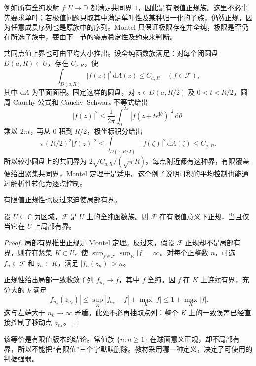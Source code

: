 \ProseParagraphBreak

例如所有全纯映射 \(f:U\to\mathbb D\) 都满足共同界 \(1\)，因此是有限值正规族。这里不必事先要求单叶；若极值问题只取其中满足单叶性及某种归一化的子族，仍然正规，因为任意成员序列也是原族中的序列。Montel 只保证极限存在并全纯，极限是否仍在所选子族中，要由下一节的零点稳定性及约束来判断。

\ProseParagraphBreak

共同点值上界也可由平均大小推出。设全纯函数族满足：对每个闭圆盘 \(\overline{D(a,R)}\subset U\)，存在 \(C_{a,R}\)，使
\[
 \int_{D(a,R)}|f(z)|^2\,\mathrm{d}A(z)\le C_{a,R}
 \quad(f\in\mathcal F),
\]
其中 \(\mathrm dA\) 为平面面积。固定这样的圆盘，对 \(z\in D(a,R/2)\) 及 \(0<t<R/2\)，圆周 Cauchy 公式和 Cauchy--Schwarz 不等式给出
\[
 |f(z)|^2
 \le\frac1{2\pi}\int_0^{2\pi}|f(z+te^{\mathrm{i}\theta})|^2\,\mathrm d\theta.
\]
乘以 \(2\pi t\)，再从 \(0\) 积到 \(R/2\)，极坐标积分给出
\[
 \pi(R/2)^2|f(z)|^2
 \le\int_{D(z,R/2)}|f(\zeta)|^2\,\mathrm dA(\zeta)
 \le C_{a,R}.
\]
所以较小圆盘上的共同界为 \(2\sqrt{C_{a,R}}/(\sqrt\pi R)\)。每点附近都有这种界，有限覆盖便给出紧集共同界，Montel 定理于是适用。这个例子说明可积的平均控制也能通过解析性转化为逐点控制。

\ProseParagraphBreak

有限值正规性也反过来迫使局部有界。
\begin{proposition}\label{b3:prop:04-normal-bounded-equivalence}
设 \(U\subseteq\mathbb C\) 为区域，\(\mathcal F\) 是 \(U\) 上的全纯函数族。则 \(\mathcal F\) 在有限值意义下正规，当且仅当它在 \(U\) 上局部有界。
\end{proposition}
\begin{proof}
局部有界推出正规是 Montel 定理。反过来，假设 \(\mathcal F\) 正规却不是局部有界，则存在紧集 \(K\subset U\)，使 \(\sup_{f\in\mathcal F}\sup_K|f|=\infty\)。对每个正整数 \(n\)，可选 \(f_n\in\mathcal F\) 和 \(z_n\in K\)，满足 \(|f_n(z_n)|>n\)。

正规性给出局部一致收敛子列 \(f_{n_k}\to f\)，其中 \(f\) 全纯。因 \(f\) 在 \(K\) 上连续有界，充分大的 \(k\) 满足
\[
 |f_{n_k}(z_{n_k})|
 \le \sup_K|f_{n_k}-f|+\max_K|f|
 \le 1+\max_K|f|.
\]
这与左端大于 \(n_k\to\infty\) 矛盾。此处不必再抽取点列：整个 \(K\) 上的一致误差已经直接控制了移动点 \(z_{n_k}\)。
\end{proof}
该等价是有限值版本的结论。常值族 \(\{n:n\ge1\}\) 在球面意义正规，却不局部有界，所以不能把“有限值”三个字默默删除。教材采用哪一种定义，决定了可使用的判据强弱。

\ProseParagraphBreak

